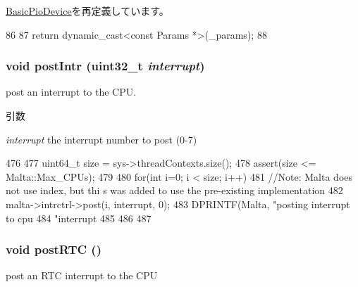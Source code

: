 \hyperlink{classBasicPioDevice_acd3c3feb78ae7a8f88fe0f110a718dff}{BasicPioDevice}を再定義しています。


\begin{DoxyCode}
86     {
87         return dynamic_cast<const Params *>(_params);
88     }
\end{DoxyCode}
\hypertarget{classMaltaCChip_a9a5bef2d9dc872c3efda198f08e08c62}{
\subsubsection[{postIntr}]{\setlength{\rightskip}{0pt plus 5cm}void postIntr ({\bf uint32\_\-t} {\em interrupt})}}
\label{classMaltaCChip_a9a5bef2d9dc872c3efda198f08e08c62}
post an interrupt to the CPU. 
\begin{DoxyParams}{引数}
\item[{\em interrupt}]the interrupt number to post (0-\/7) \end{DoxyParams}



\begin{DoxyCode}
476 {
477     uint64_t size = sys->threadContexts.size();
478     assert(size <= Malta::Max_CPUs);
479 
480     for(int i=0; i < size; i++) {
481                                         //Note: Malta does not use index, but thi
      s was added to use the pre-existing implementation
482               malta->intrctrl->post(i, interrupt, 0);
483               DPRINTF(Malta, "posting  interrupt to cpu %
484                         "interrupt %
485    }
486 
487 }
\end{DoxyCode}
\hypertarget{classMaltaCChip_acdd7f639bc4c5a8d164d48a96734d6c1}{
\subsubsection[{postRTC}]{\setlength{\rightskip}{0pt plus 5cm}void postRTC ()}}
\label{classMaltaCChip_acdd7f639bc4c5a8d164d48a96734d6c1}
post an RTC interrupt to the CPU 


